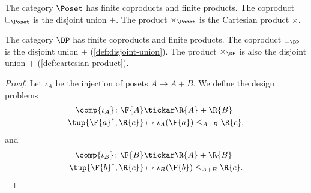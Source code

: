 \begin{example}
    The category $\Poset$ has finite coproducts and finite products.
    The coproduct $\sqcup_\Poset$ is the disjoint union $+$.
    The product $\times_\Poset$ is the Cartesian product $\times$.
\end{example}

\begin{lemma}
    The category $\DP$ has finite coproducts and finite products.
    The coproduct $\sqcup_\DP$ is the disjoint union $+$ (\cref{def:disjoint-union}).
    The product $\times_\DP$ is also the disjoint union $+$ (\cref{def:cartesian-product}).
\end{lemma}

\begin{proof}
Let $\iota_A$ be the injection of posets $A \to A+B$. We define the design problems
\begin{equation}
    \begin{aligned}
    \comp{\iota_A} \colon \F{A} &\tickar \R{A} + \R{B}\\
    \tup{\F{a}^*,\R{c}} &\mapsto \iota_A(\F{a})\leq_{A+B}\R{c},
    \end{aligned}
\end{equation}
and 
\begin{equation}
    \begin{aligned}
    \comp{\iota_B} \colon \F{B} &\tickar \R{A} + \R{B}\\
    \tup{\F{b}^*,\R{c}} &\mapsto \iota_B(\F{b})\leq_{A+B}\R{c}.
    \end{aligned}
\end{equation}


\end{proof}
